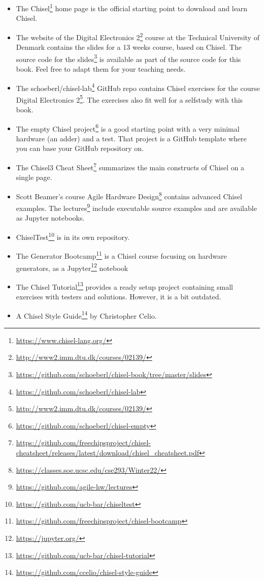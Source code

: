 \documentclass[%
    10pt,
    headinclude, footexclude,
    openright, %
    notitlepage,
    cleardoubleempty,
    headsepline,
    pointlessnumbers,
    bibtotoc, idxtotoc,
    ]{scrbook}
\newcommand{\myref}[2]{\href{#1}{#2}}
\renewcommand{\myref}[2]{{#2}{\footnote{\url{#1}}}}
\begin{document}
\begin{itemize}
\item The \myref{https://www.chisel-lang.org/}{Chisel} home page is the official starting point to
download and learn Chisel.
\item The website of the \myref{http://www2.imm.dtu.dk/courses/02139/}{Digital Electronics 2} course
at the Technical University of Denmark contains the slides for a 13 weeks course, based on Chisel.
The source code for the \myref{https://github.com/schoeberl/chisel-book/tree/master/slides}{slides}
is available as part of the source code for this book. Feel free to adapt them for your teaching needs.
\item The \myref{https://github.com/schoeberl/chisel-lab}{schoeberl/chisel-lab} GitHub repo
contains Chisel exercises for the course \myref{http://www2.imm.dtu.dk/courses/02139/}{Digital Electronics 2}.
The exercises also fit well for a selfstudy with this book.
\item The \myref{https://github.com/schoeberl/chisel-empty}{empty Chisel project} is a good starting
point with a very minimal hardware (an adder) and a test. That project is a GitHub template where you
can base your GitHub repository on.
\item The \myref{https://github.com/freechipsproject/chisel-cheatsheet/releases/latest/download/chisel_cheatsheet.pdf}{Chisel3 Cheat Sheet} summarizes the main constructs of Chisel on a single page.
\item Scott Beamer's course \myref{https://classes.soe.ucsc.edu/cse293/Winter22/}{Agile Hardware Design}
contains advanced Chisel examples. The \myref{https://github.com/agile-hw/lectures}{lectures}
include executable source examples and are available as Jupyter notebooks.
\item \myref{https://github.com/ucb-bar/chiseltest}{ChiselTest} is in
its own repository.
\item The \myref{https://github.com/freechipsproject/chisel-bootcamp}{Generator Bootcamp} is
a Chisel course focusing on hardware generators, as a \myref{https://jupyter.org/}{Jupyter} notebook
\item The \myref{https://github.com/ucb-bar/chisel-tutorial}{Chisel Tutorial} provides a ready setup
project containing small exercises with testers and solutions. However, it is a bit outdated.
\item A \myref{https://github.com/ccelio/chisel-style-guide}{Chisel Style Guide} by Christopher Celio.

\end{itemize}
\end{document}
